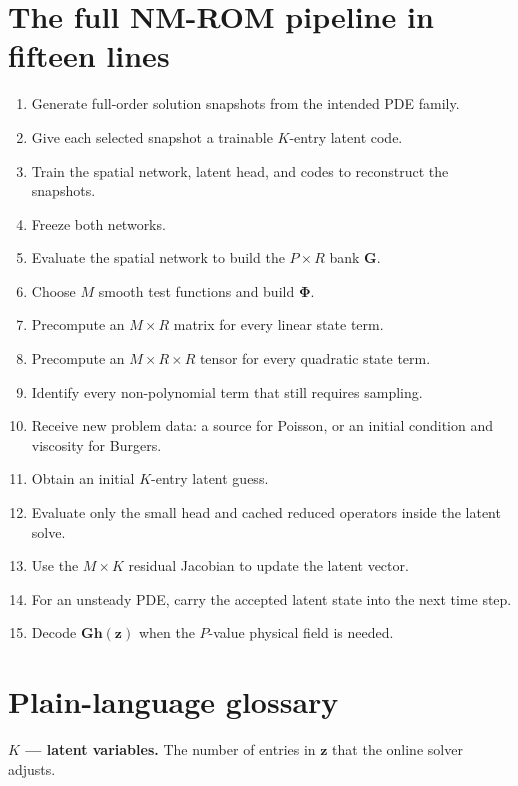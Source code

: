 \documentclass[11pt]{article}
\newcommand{\mat}[1]{\mathbf{#1}}
\newcommand{\vect}[1]{\mathbf{#1}}
\begin{document}
\section{The full NM-ROM pipeline in fifteen lines}

\begin{enumerate}
  \item Generate full-order solution snapshots from the intended PDE family.
  \item Give each selected snapshot a trainable $K$-entry latent code.
  \item Train the spatial network, latent head, and codes to reconstruct the snapshots.
  \item Freeze both networks.
  \item Evaluate the spatial network to build the $P\times R$ bank $\mat{G}$.
  \item Choose $M$ smooth test functions and build $\mat{\Phi}$.
  \item Precompute an $M\times R$ matrix for every linear state term.
  \item Precompute an $M\times R\times R$ tensor for every quadratic state term.
  \item Identify every non-polynomial term that still requires sampling.
  \item Receive new problem data: a source for Poisson, or an initial condition and viscosity for Burgers.
  \item Obtain an initial $K$-entry latent guess.
  \item Evaluate only the small head and cached reduced operators inside the latent solve.
  \item Use the $M\times K$ residual Jacobian to update the latent vector.
  \item For an unsteady PDE, carry the accepted latent state into the next time step.
  \item Decode $\mat{G}\vect{h}(\vect{z})$ when the $P$-value physical field is needed.
\end{enumerate}

\clearpage
\section*{Plain-language glossary}

\begingroup
\setlength{\parskip}{0.5em}

\textbf{$K$ --- latent variables.}
The number of entries in $\vect{z}$ that the online solver adjusts.
\end{document}
